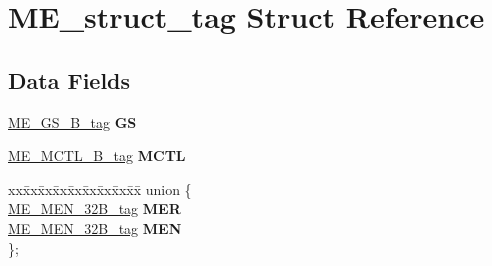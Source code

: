 \hypertarget{structME__struct__tag}{}\section{M\+E\+\_\+struct\+\_\+tag Struct Reference}
\label{structME__struct__tag}
\subsection*{Data Fields}
\begin{DoxyCompactItemize}
\item 
\mbox{\label{structME__struct__tag_a380d74076b9a63a5b79fd6c9fbff591f}} 
\mbox{\hyperlink{unionME__GS__32B__tag}{M\+E\+\_\+\+G\+S\+\_\+B\+\_\+tag}} {\bfseries GS}
\item 
\mbox{\label{structME__struct__tag_a0c292926e78815a5194e7290aeda2d6d}} 
\mbox{\hyperlink{unionME__MCTL__32B__tag}{M\+E\+\_\+\+M\+C\+T\+L\+\_\+B\+\_\+tag}} {\bfseries M\+C\+TL}
\item 
\mbox{\label{structME__struct__tag_a11a34aa414a08dba5626d54c0fe441d0}} 
\begin{tabbing}
xx\=xx\=xx\=xx\=xx\=xx\=xx\=xx\=xx\=\kill
union \{\\
\>\mbox{\hyperlink{unionME__MEN__32B__tag}{ME\_MEN\_32B\_tag}} {\bfseries MER}\\
\>\mbox{\hyperlink{unionME__MEN__32B__tag}{ME\_MEN\_32B\_tag}} {\bfseries MEN}\\
\}; \\


\end{tabbing}
\end{DoxyCompactItemize}

